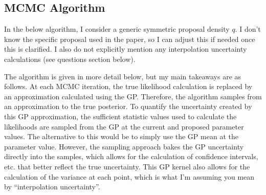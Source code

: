 \documentclass[12pt]{article}
\begin{document}
\subsection{MCMC Algorithm}
In the below algorithm, I consider a generic symmetric proposal density $q$. I don't know the specific proposal used in the paper, so I can adjust this if needed once this 
is clarified. I also do not explicitly mention any interpolation uncertainty calculations (see questions section below). 

The algorithm is given in more detail below, but my main takeaways are as follows. At each MCMC iteration, the true likelihood calculation is replaced by an approximation calculated 
using the GP. Therefore, the algorithm samples from an approximation to the true posterior. To quantify the uncertainty created by this GP approximation, the sufficient statistic values
used to calculate the likelihoods are sampled from the GP at the current and proposed parameter values. The alternative to this would be to simply use the GP mean at the parameter value. 
However, the sampling approach bakes the GP uncertainty directly into the samples, which allows for the calculation of confidence intervals, etc. that better reflect the true uncertainty. 
This GP kernel also allows for the calculation of the variance at each point, which is what I'm assuming you mean by ``interpolation uncertainty''. 
\bigskip
\end{document}
